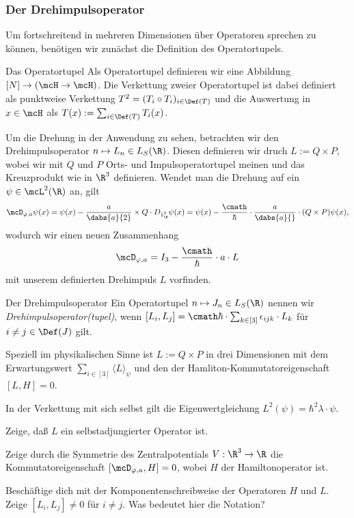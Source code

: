 \documentclass{subfiles}
\begin{document}
    \subsubsection*{Der Drehimpulsoperator}
        Um fortschreitend in mehreren Dimensionen über Operatoren sprechen zu können, benötigen wir zunächst die Definition des Operatortupels.
        \begin{mdef}{Das Operatortupel}
            Als Operatortupel definieren wir eine Abbildung $[N]\to(\mcH\to\mcH)$. Die Verkettung zweier Operatortupel ist dabei definiert als punktweise Verkettung $T^2 = (T_i\circ T_i)_{i\in\Def(T)}$ und die Auswertung in $x\in\mcH$ als $T(x) := \sum_{i\in\Def(T)}T_i(x)$.  
        \end{mdef}
        Um die Drehung in der Anwendung zu sehen, betrachten wir den Drehimpulsoperator $n\mapsto L_n\in L_S(\R)$. Diesen definieren wir druch $L:=Q\times P$, wobei wir mit $Q$ und $P$ Orts- und Impulsoperatortupel meinen und das Kreuzprodukt wie in $\R^3$ definieren. Wendet man die Drehung auf ein $\psi\in\mcL^2(\R)$ an, gilt
        \[
            \mcD_{\varphi,a}\psi(x) = \psi(x) - \frac{a}{\dabs{a}{2}}\times Q\cdot D_{1_\R^3}\psi(x) = \psi(x) - \frac{\cmath}{\hbar}\cdot\frac{a}{\dabs{a}{}}\cdot(Q\times P)\psi(x),
        \]
        wodurch wir einen neuen Zusammenhang
        \[\mcD_{\varphi,a} = I_3 - \frac{\cmath}{\hbar}\cdot a\cdot L\]
        mit unserem definierten Drehimpuls $L$ vorfinden. 
        \begin{mdef}{Der Drehimpulsoperator}
            Ein Operatortupel $n\mapsto J_n\in L_S(\R)$ nennen wir \emph{Drehimpulsoperator(tupel)}, wenn $[L_i,L_j] = \cmath\hbar\cdot\sum_{k\in[3]}\epsilon_{ijk}\cdot L_k$ für $i\neq j\in\Def(J)$ gilt. 

            Speziell im physikalischen Sinne ist $L:=Q\times P$ in drei Dimensionen mit dem Erwartungswert $\sum_{i\in[3]}\langle L\rangle_\psi$ und den der Hamliton-Kommutatoreigenschaft $[L,H] = 0$. 
            
            In der Verkettung mit sich selbst gilt die Eigenwertgleichung $L^2(\psi) = \hbar^2\lambda\cdot\psi$.
        \end{mdef}
        \begin{Aufgabe}
            \nr{} Zeige, daß $L$ ein selbstadjungierter Operator ist. 

            \nr{} Zeige durch die Symmetrie des Zentralpotentials $V:\R^3\to\R$ die Kommutatoreigenschaft $[\mcD_{\varphi,a},H] = 0$, wobei $H$ der Hamiltonoperator ist. 

            \nr{} Beschäftige dich mit der Komponentenschreibweise der Operatoren $H$ und $L$. Zeige $[L_i,L_j]\neq 0$ für $i\neq j$. Was bedeutet hier die Notation?
        \end{Aufgabe}
\end{document}
